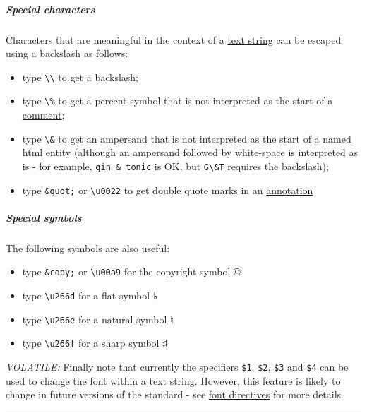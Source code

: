 \subparagraph{Special characters}\label{special_characters}

Characters that are meaningful in the context of a
\protect\hyperlink{text_string_definition}{text string} can be escaped
using a backslash as follows:

\begin{itemize}
\item
  type \texttt{\textbackslash{}\textbackslash{}} to get a backslash;
\item
  type \texttt{\textbackslash{}\%} to get a percent symbol that is not
  interpreted as the start of a
  \protect\hyperlink{comments_and_remarks}{comment};
\item
  type \texttt{\textbackslash{}\&} to get an ampersand that is not
  interpreted as the start of a named html entity (although an ampersand
  followed by white-space is interpreted as is - for example,
  \texttt{gin\ \&\ tonic} is OK, but \texttt{G\textbackslash{}\&T}
  requires the backslash);
\item
  type \texttt{\&quot;} or \texttt{\textbackslash{}u0022} to get double
  quote marks in an \protect\hyperlink{annotations}{annotation}
\end{itemize}

\hypertarget{special_symbols}{\subparagraph{Special
symbols}\label{special_symbols}}

The following symbols are also useful:

\begin{itemize}
\item
  type \texttt{\&copy;} or \texttt{\textbackslash{}u00a9} for the
  copyright symbol ©
\item
  type \texttt{\textbackslash{}u266d} for a flat symbol ♭
\item
  type \texttt{\textbackslash{}u266e} for a natural symbol ♮
\item
  type \texttt{\textbackslash{}u266f} for a sharp symbol ♯
\end{itemize}

\emph{VOLATILE:} Finally note that currently the specifiers
\texttt{\$1}, \texttt{\$2}, \texttt{\$3} and \texttt{\$4} can be used to
change the font within a \protect\hyperlink{text_string_definition}{text
string}. However, this feature is likely to change in future versions of
the standard - see \protect\hyperlink{font_directives}{font directives}
for more details.

\begin{center}\rule{0.5\linewidth}{\linethickness}\end{center}

